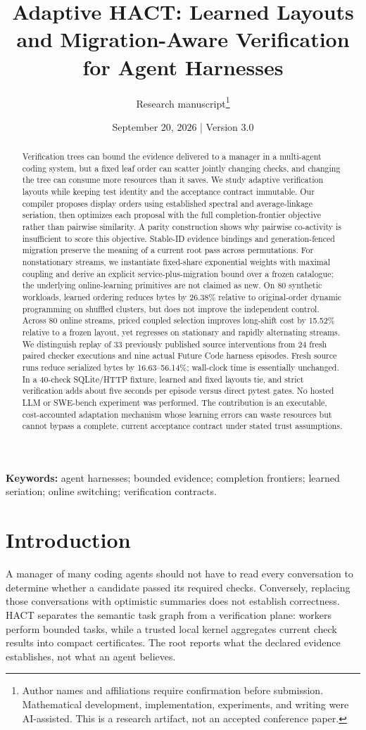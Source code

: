 \documentclass[11pt]{article}
\title{\vspace{-9mm}\textbf{Adaptive HACT: Learned Layouts and Migration-Aware Verification for Agent Harnesses}}
\author{Research manuscript\thanks{Author names and affiliations require confirmation before submission. Mathematical development, implementation, experiments, and writing were AI-assisted. This is a research artifact, not an accepted conference paper.}}
\date{September 20, 2026 \quad | \quad Version 3.0}
\theoremstyle{definition}\newtheorem{definition}[theorem]{Definition}
\begin{document}
\maketitle
\begin{abstract}
Verification trees can bound the evidence delivered to a manager in a multi-agent coding system, but a fixed leaf order can scatter jointly changing checks, and changing the tree can consume more resources than it saves. We study adaptive verification layouts while keeping test identity and the acceptance contract immutable. Our compiler proposes display orders using established spectral and average-linkage seriation, then optimizes each proposal with the full completion-frontier objective rather than pairwise similarity. A parity construction shows why pairwise co-activity is insufficient to score this objective. Stable-ID evidence bindings and generation-fenced migration preserve the meaning of a current root pass across permutations. For nonstationary streams, we instantiate fixed-share exponential weights with maximal coupling and derive an explicit service-plus-migration bound over a frozen catalogue; the underlying online-learning primitives are not claimed as new. On 80 synthetic workloads, learned ordering reduces bytes by 26.38\% relative to original-order dynamic programming on shuffled clusters, but does not improve the independent control. Across 80 online streams, priced coupled selection improves long-shift cost by 15.52\% relative to a frozen layout, yet regresses on stationary and rapidly alternating streams. We distinguish replay of 33 previously published source interventions from 24 fresh paired checker executions and nine actual Future Code harness episodes. Fresh source runs reduce serialized bytes by 16.63--56.14\%; wall-clock time is essentially unchanged. In a 40-check SQLite/HTTP fixture, learned and fixed layouts tie, and strict verification adds about five seconds per episode versus direct pytest gates. No hosted LLM or SWE-bench experiment was performed. The contribution is an executable, cost-accounted adaptation mechanism whose learning errors can waste resources but cannot bypass a complete, current acceptance contract under stated trust assumptions.
\end{abstract}
\noindent\textbf{Keywords:} agent harnesses; bounded evidence; completion frontiers; learned seriation; online switching; verification contracts.

\section{Introduction}
A manager of many coding agents should not have to read every conversation to determine whether a candidate passed its required checks. Conversely, replacing those conversations with optimistic summaries does not establish correctness. HACT separates the semantic task graph from a verification plane: workers perform bounded tasks, while a trusted local kernel aggregates current check results into compact certificates. The root reports what the declared evidence establishes, not what an agent believes.
\end{document}
